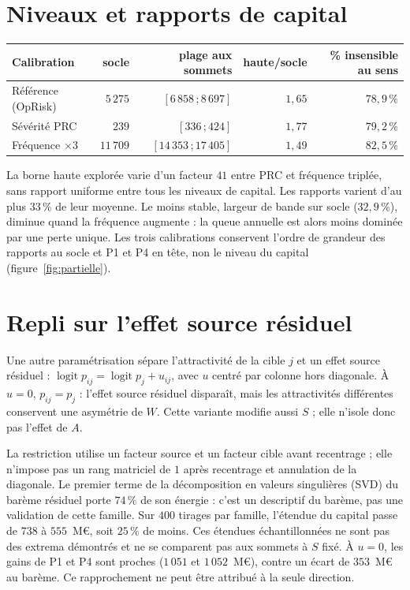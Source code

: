 
\section{Niveaux et rapports de capital}

\begin{center}\footnotesize
\renewcommand{\arraystretch}{1.25}
\begin{tabular}{@{}p{4.3cm} r r r r@{}}
\toprule
\textbf{Calibration} & \textbf{socle} & \textbf{plage aux sommets} &
\textbf{haute/socle} & \textbf{\% insensible au sens} \\
\midrule
Référence (OpRisk)   & $5\,275$  & $[6\,858\,;8\,697]$   & $1{,}65$ & $78{,}9\,\%$ \\
Sévérité PRC         & $239$     & $[336\,;424]$         & $1{,}77$ & $79{,}2\,\%$ \\
Fréquence $\times 3$ & $11\,709$ & $[14\,353\,;17\,405]$ & $1{,}49$ & $82{,}5\,\%$ \\
\bottomrule
\end{tabular}
\end{center}

\vspace{2pt}
\noindent La borne haute explorée varie d'un facteur $41$ entre PRC et fréquence triplée, sans
rapport uniforme entre tous les niveaux de capital. Les rapports varient d'au plus $33\,\%$ de
leur moyenne. Le moins stable, largeur de bande sur socle ($32{,}9\,\%$), diminue quand la fréquence
augmente : la queue annuelle est alors moins dominée par une perte unique. Les trois calibrations
conservent l'ordre de grandeur des rapports au socle et P1 et P4 en tête, non le niveau du capital
(figure~\ref{fig:partielle}).

\section{Repli sur l'effet source résiduel}
\label{sec:echelle-u}

Une autre paramétrisation sépare l'attractivité de la cible $j$ et un effet source résiduel :
$\operatorname{logit}p_{ij}=\operatorname{logit}p_j+u_{ij}$, avec $u$ centré par colonne hors diagonale.
À $u=0$, $p_{ij}=p_j$ : l'effet source résiduel disparaît, mais les attractivités différentes
conservent une asymétrie de $W$. Cette variante modifie aussi $S$ ; elle n'isole donc pas l'effet de $A$.

La restriction utilise un facteur source et un facteur cible avant recentrage ; elle n'impose pas
un rang matriciel de $1$ après recentrage et annulation de la diagonale. Le premier terme de la
décomposition en valeurs singulières (SVD) du barème résiduel porte $74\,\%$ de son énergie : c'est un
descriptif du barème, pas une validation de cette famille. Sur $400$ tirages par famille, l'étendue
du capital passe de $738$ à $555$~M\euro{}, soit $25\,\%$ de moins. Ces étendues échantillonnées
ne sont pas des extrema démontrés et ne se comparent pas aux sommets à $S$ fixé.
À $u=0$, les gains de P1 et P4 sont proches ($1\,051$ et $1\,052$~M\euro{}), contre un écart
de $353$~M\euro{} au barème. Ce rapprochement ne peut être attribué à la seule direction.

